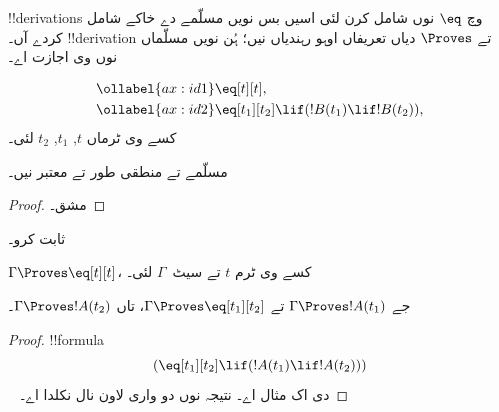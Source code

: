 \documentclass[../../../include/open-logic-section]{subfiles}
\begin{document}


!!{derivation}s وچ $\eq$ نوں شامل کرن لئی اسیں بس نویں مسلّمے دے
خاکے شامل کردے آں۔ !!{derivation} تے $\Proves$ دیاں تعریفاں
اوہو رہندیاں نیں؛ ہُن نویں مسلّماں نوں وی اجازت اے۔

\begin{defn}
\begin{align}
\ollabel{ax:id1} & \eq[t][t], \\
\ollabel{ax:id2} & \eq[t_1][t_2] \lif (!B(t_1) \lif
  !B(t_2)),
\end{align}
کسے وی ٹرماں $t$, $t_1$, $t_2$ لئی۔
\end{defn}

\begin{prop}
  مسلّمے  تے  منطقی طور تے معتبر نیں۔
\end{prop}

\begin{proof}
  مشق۔
\end{proof}

\begin{prob}
 ثابت کرو۔
\end{prob}

\begin{prop}
 $\Gamma \Proves \eq[t][t]$، کسے وی ٹرم $t$ تے سیٹ~$\Gamma$ لئی۔
\end{prop}

\begin{prop}
  جے $\Gamma \Proves !A(t_1)$ تے $\Gamma \Proves
  \eq[t_1][t_2]$، تاں $\Gamma \Proves !A(t_2)$۔
\end{prop}

\begin{proof}
!!{formula}
\[
(\eq[t_1][t_2] \lif (!A(t_1) \lif !A(t_2)))
\]
~ دی اک مثال اے۔ نتیجہ \MP نوں دو واری
لاون نال نکلدا اے۔
\end{proof}
\end{document}
